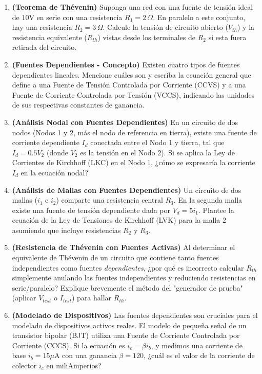 \documentclass[12pt, a4paper]{article}
\begin{document}
\begin{enumerate}[leftmargin=*, itemsep=1.5em]
    \item \textbf{(Teorema de Thévenin)} Suponga una red con una fuente de tensión ideal de $10\text{V}$ en serie con una resistencia $R_1 = 2\,\Omega$. En paralelo a este conjunto, hay una resistencia $R_2 = 3\,\Omega$. Calcule la tensión de circuito abierto ($V_{th}$) y la resistencia equivalente ($R_{th}$) vistas desde los terminales de $R_2$ si esta fuera retirada del circuito.

    \item \textbf{(Fuentes Dependientes - Concepto)} Existen cuatro tipos de fuentes dependientes lineales. Mencione cuáles son y escriba la ecuación general que define a una Fuente de Tensión Controlada por Corriente (CCVS) y a una Fuente de Corriente Controlada por Tensión (VCCS), indicando las unidades de sus respectivas constantes de ganancia.

    \item \textbf{(Análisis Nodal con Fuentes Dependientes)} En un circuito de dos nodos (Nodos 1 y 2, más el nodo de referencia en tierra), existe una fuente de corriente dependiente $I_d$ conectada entre el Nodo 1 y tierra, tal que $I_d = 0.5 V_2$ (donde $V_2$ es la tensión en el Nodo 2). Si se aplica la Ley de Corrientes de Kirchhoff (LKC) en el Nodo 1, ¿cómo se expresaría la corriente $I_d$ en la ecuación nodal?

    \item \textbf{(Análisis de Mallas con Fuentes Dependientes)} Un circuito de dos mallas ($i_1$ e $i_2$) comparte una resistencia central $R_3$. En la segunda malla existe una fuente de tensión dependiente dada por $V_d = 5 i_1$. Plantee la ecuación de la Ley de Tensiones de Kirchhoff (LVK) para la malla 2 asumiendo que incluye resistencias $R_2$ y $R_3$.

    \item \textbf{(Resistencia de Thévenin con Fuentes Activas)} Al determinar el equivalente de Thévenin de un circuito que contiene tanto fuentes independientes como fuentes \textit{dependientes}, ¿por qué es incorrecto calcular $R_{th}$ simplemente anulando las fuentes independientes y reduciendo resistencias en serie/paralelo? Explique brevemente el método del "generador de prueba" (aplicar $V_{test}$ o $I_{test}$) para hallar $R_{th}$.

    \item \textbf{(Modelado de Dispositivos)} Las fuentes dependientes son cruciales para el modelado de dispositivos activos reales. El modelo de pequeña señal de un transistor bipolar (BJT) utiliza una Fuente de Corriente Controlada por Corriente (CCCS). Si la ecuación es $i_c = \beta i_b$, y medimos una corriente de base $i_b = 15\mu\text{A}$ con una ganancia $\beta = 120$, ¿cuál es el valor de la corriente de colector $i_c$ en miliAmperios?


\end{enumerate}
\end{document}
